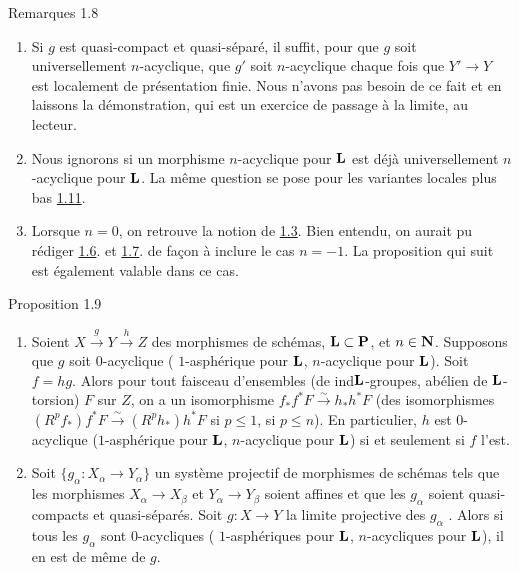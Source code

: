 \documentclass[10pt]{../fichiers-configuration-latex/smfart}
\begin{document}
\begin{enonce*}[remark]{Remarques 1.8}
\begin{enumerate}
\renewcommand{\theenumi}{\alph{enumi}}
\renewcommand{\labelenumi}{\theenumi)}
\item Si $g$ est quasi-compact et quasi-séparé, il suffit, pour que
$g$ soit universellement $n$-acyclique, que $g'$ soit $n$-acyclique
chaque fois que $Y'\rightarrow Y$ est localement de présentation
finie. Nous n'avons pas besoin de ce fait et en laissons la
démonstration, qui est un exercice de passage à la limite, au lecteur.

\item Nous ignorons si un morphisme $n$-acyclique pour $\mathbf{L}$
est déjà universellement $n$-acyclique pour $\mathbf{L}$. La même
question se pose pour les variantes locales plus bas \hyperref[XV.def1.11]{1.11}.

\item Lorsque $n=0$, on retrouve la notion de \hyperref[XV.def1.3]{1.3}. Bien
entendu, on aurait pu rédiger \hyperref[XV.prop1.6]{1.6}. et \hyperref[XV.def1.7]{1.7}. de
façon à inclure le cas $n=-1$. La proposition qui suit est
également valable dans ce cas.\pageoriginale
\end{enumerate}
\end{enonce*}

\begin{enonce*}{Proposition 1.9}
\begin{enumerate}
\renewcommand{\theenumi}{\roman{enumi}}
\renewcommand{\labelenumi}{(\theenumi)}
\item Soient $X\xrightarrow{g}Y\xrightarrow{h}Z$ des morphismes de
schémas, $\mathbf{L}\subset \mathbf{P}$, et $n\in
\mathbf{N}$. Supposons que $g$ soit $0$-acyclique (\resp
$1$-asphérique pour $\mathbf{L}$, \resp $n$-acyclique pour
$\mathbf{L}$). Soit $f=hg$. Alors pour tout faisceau d'ensembles
(\resp de ind\sisi{-}{ }$\mathbf{L}$-groupes, \resp abélien de
$\mathbf{L}$-torsion) $F$ sur $Z$, on a un isomorphisme
$f_{\ast}f^{\ast}F\xrightarrow{\sim} h_{\ast}h^{\ast}F$ (\resp des
isomorphismes $(R^{p}f_{\ast})f^{\ast}F\xrightarrow{\sim}
(R^{p}h_{\ast})h^{\ast}F$ si $p\leq 1$, \resp si $p\leq n$). En
particulier, $h$ est $0$-acyclique (\resp $1$-asphérique pour
$\mathbf{L}$, \resp $n$-acyclique pour $\mathbf{L}$) si et seulement
si $f$ l'est.

\item Soit $\{g_{\alpha}:X_{\alpha}\rightarrow Y_{\alpha}\}$ un
système projectif de morphismes de schémas tels que les morphismes
$X_{\alpha}\rightarrow X_{\beta}$ et $Y_{\alpha}\rightarrow Y_{\beta}$
soient affines et que les $g_{\alpha}$ soient quasi-compacts et
quasi-séparés. Soit $g:X\rightarrow Y$ la limite projective des $g_{\alpha}$
.
Alors si tous les $g_{\alpha}$ sont $0$-acycliques (\resp
$1$-asphériques pour $\mathbf{L}$, \resp $n$-acycliques pour
$\mathbf{L}$), il en est de même de $g$.
\end{enumerate}
\end{enonce*}
\end{document}
